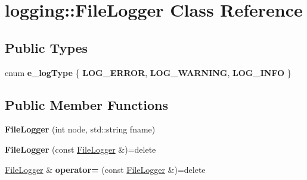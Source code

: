 \hypertarget{classlogging_1_1_file_logger}{}\section{logging\+:\+:File\+Logger Class Reference}
\label{classlogging_1_1_file_logger}
\subsection*{Public Types}
\begin{DoxyCompactItemize}
\item 
\mbox{\label{classlogging_1_1_file_logger_a2ee70febdd1432400fa07ea2a17f0623}} 
enum {\bfseries e\+\_\+log\+Type} \{ {\bfseries L\+O\+G\+\_\+\+E\+R\+R\+OR}, 
{\bfseries L\+O\+G\+\_\+\+W\+A\+R\+N\+I\+NG}, 
{\bfseries L\+O\+G\+\_\+\+I\+N\+FO}
 \}
\end{DoxyCompactItemize}
\subsection*{Public Member Functions}
\begin{DoxyCompactItemize}
\item 
\mbox{\label{classlogging_1_1_file_logger_aa7cf2acb1b01e2b2c84fa5dcc115b1a6}} 
{\bfseries File\+Logger} (int node, std\+::string fname)
\item 
\mbox{\label{classlogging_1_1_file_logger_afaf1c31e9419b40e8bcb5e1594c8cb02}} 
{\bfseries File\+Logger} (const \hyperlink{classlogging_1_1_file_logger}{File\+Logger} \&)=delete
\item 
\mbox{\label{classlogging_1_1_file_logger_a3f0eac39db9ec86285ae9909ff7d2d98}} 
\hyperlink{classlogging_1_1_file_logger}{File\+Logger} \& {\bfseries operator=} (const \hyperlink{classlogging_1_1_file_logger}{File\+Logger} \&)=delete
\end{DoxyCompactItemize}
